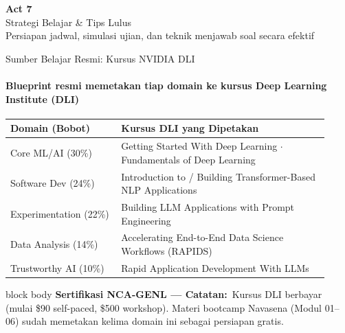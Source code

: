 \documentclass[aspectratio=169,t]{beamer}
\newcommand{\acttitle}[3]{%
  \begin{frame}[plain]
    \vspace{1.5cm}
    \begin{center}
      {\color{nvgreen}\Huge\bfseries Act #1}\\[1.2em]
      {\color{nvwhite}\Huge #2}\\[0.8em]
      {\color{nvgray}\Large #3}
    \end{center}
  \end{frame}%
}
\newcommand{\certnote}[2]{%
  \vspace{0.1em}
  \begin{beamercolorbox}[rounded=true,shadow=false,sep=4pt]{block body}
    {\scriptsize\color{nvblue}\textbf{Sertifikasi NCA-GENL --- #1:}}\,
    {\scriptsize\color{nvgray}#2}
  \end{beamercolorbox}%
}
\begin{document}
\acttitle{7}{Strategi Belajar \& Tips Lulus}{Persiapan jadwal, simulasi ujian, dan teknik menjawab soal secara efektif}

\begin{frame}{Sumber Belajar Resmi: Kursus NVIDIA DLI}
  \framesubtitle{Blueprint resmi memetakan tiap domain ke kursus Deep Learning Institute (DLI)}
  \begin{center}
  \renewcommand{\arraystretch}{1.25}{\footnotesize\setlength{\tabcolsep}{6pt}
  \begin{tabular}{@{}p{0.32\linewidth}p{0.60\linewidth}@{}}
    \toprule \rowcolor{nvcard!50}
    \textbf{Domain (Bobot)} & \textbf{Kursus DLI yang Dipetakan} \\ \midrule
    Core ML/AI (30\%) & Getting Started With Deep Learning $\cdot$ Fundamentals of Deep Learning \\
    Software Dev (24\%) & Introduction to / Building Transformer-Based NLP Applications \\
    Experimentation (22\%) & Building LLM Applications with Prompt Engineering \\
    Data Analysis (14\%) & Accelerating End-to-End Data Science Workflows (RAPIDS) \\
    Trustworthy AI (10\%) & Rapid Application Development With LLMs \\
    \bottomrule
  \end{tabular}}
  \end{center}
  \certnote{Catatan}{Kursus DLI berbayar (mulai \$90 self-paced, \$500 workshop). Materi bootcamp Navasena (Modul 01--06) sudah memetakan kelima domain ini sebagai persiapan gratis.}
\end{frame}
\end{document}
